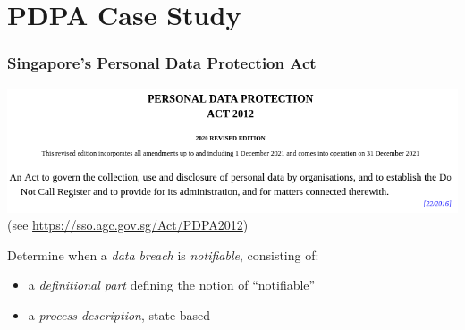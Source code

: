 \documentclass{beamer}
\begin{document}
\section{PDPA Case Study}


\begin{frame}[fragile]\frametitle{Singapore's Personal Data Protection Act}

  \begin{center}
    \includegraphics[scale=0.5]{Figures/pdpa_lawtext.png}\\
    {\tiny (see \url{https://sso.agc.gov.sg/Act/PDPA2012})}
  \end{center}  

  Determine when a \emph{data breach} is \emph{notifiable}, consisting of:
  \begin{itemize}
  \item a \emph{definitional part} defining the notion of ``notifiable''
  \item a \emph{process description}, state based
  \end{itemize}

\end{frame}
\end{document}
